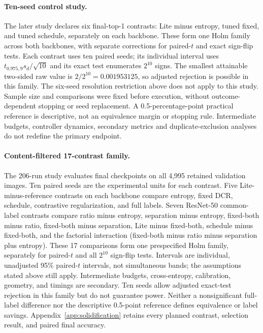 \documentclass[10pt,a4paper,twocolumn]{article}
\begin{document}
\paragraph{Ten-seed control study.}
The later study declares six final-top-1 contrasts: Lite minus entropy,
tuned fixed, and tuned schedule, separately on each backbone. These form
one Holm family across both backbones, with separate corrections for
paired-$t$ and exact sign-flip tests. Each contrast uses ten paired seeds;
its individual interval uses $t_{0.975,9}s_d/\sqrt{10}$ and its exact
test enumerates $2^{10}$ signs. The smallest attainable two-sided raw
value is $2/2^{10}=0.001953125$, so adjusted rejection is possible in
this family. The six-seed resolution restriction above does not apply
to this study. Sample size and comparisons were fixed before execution,
without outcome-dependent stopping or seed replacement. A 0.5-percentage-point
practical reference is descriptive, not an equivalence margin or stopping
rule. Intermediate budgets, controller dynamics, secondary metrics and
duplicate-exclusion analyses do not redefine the primary endpoint.

\paragraph{Content-filtered 17-contrast family.}
The 206-run study evaluates final checkpoints on all 4,995 retained
validation images. Ten paired seeds are the experimental units for each
contrast. Five Lite-minus-reference contrasts on each backbone compare
entropy, fixed DCR, schedule, contrastive regularization, and full labels.
Seven ResNet-50 common-label contrasts compare ratio minus entropy,
separation minus entropy, fixed-both minus ratio, fixed-both minus
separation, Lite minus fixed-both, schedule minus fixed-both, and the
factorial interaction (fixed-both minus ratio minus separation plus
entropy). These 17 comparisons form one prespecified Holm family,
separately for paired-$t$ and all $2^{10}$ sign-flip tests. Intervals
are individual, unadjusted 95\% paired-$t$ intervals, not simultaneous
bands; the assumptions stated above still apply. Intermediate budgets,
cross-entropy, calibration, geometry, and timings are secondary.
Ten seeds allow adjusted exact-test rejection in this family but do not
guarantee power. Neither a nonsignificant full-label difference nor
the descriptive 0.5-point reference defines equivalence or label savings.
Appendix~\ref{app:solidification} retains every planned contrast,
selection result, and paired final accuracy.
\end{document}
